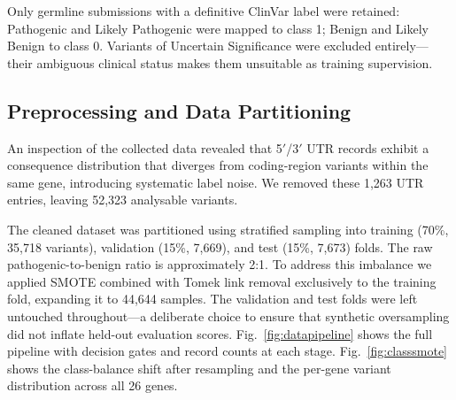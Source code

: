 \documentclass[conference]{IEEEtran}
\begin{document}
Only germline submissions with a definitive ClinVar label were
retained: Pathogenic and Likely Pathogenic were mapped to class 1;
Benign and Likely Benign to class 0. Variants of Uncertain
Significance were excluded entirely---their ambiguous clinical
status makes them unsuitable as training supervision.

\subsection{Preprocessing and Data Partitioning}

An inspection of the collected data revealed that 5$'$/3$'$ UTR
records exhibit a consequence distribution that diverges from
coding-region variants within the same gene, introducing
systematic label noise. We removed these 1,263 UTR entries,
leaving 52,323 analysable variants.

The cleaned dataset was partitioned using stratified sampling into
training (70\%, 35,718 variants), validation (15\%, 7,669), and
test (15\%, 7,673) folds. The raw pathogenic-to-benign ratio is
approximately 2:1. To address this imbalance we applied SMOTE
combined with Tomek link removal exclusively to the training fold,
expanding it to 44,644 samples. The validation and test folds
were left untouched throughout---a deliberate choice to ensure
that synthetic oversampling did not inflate held-out evaluation
scores. Fig.~\ref{fig:datapipeline} shows the full pipeline
with decision gates and record counts at each stage.
Fig.~\ref{fig:classsmote} shows the class-balance shift after
resampling and the per-gene variant distribution across all 26
genes.
\end{document}

